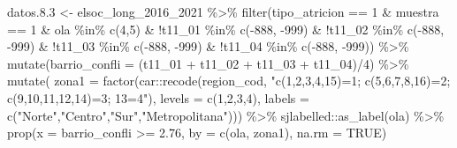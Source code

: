 \documentclass[
  12pt,
]{book}
\newenvironment{Shaded}{\begin{snugshade}}{\end{snugshade}}
\newcommand{\AttributeTok}[1]{\textcolor[rgb]{0.77,0.63,0.00}{#1}}
\newcommand{\ConstantTok}[1]{\textcolor[rgb]{0.00,0.00,0.00}{#1}}
\newcommand{\DecValTok}[1]{\textcolor[rgb]{0.00,0.00,0.81}{#1}}
\newcommand{\FloatTok}[1]{\textcolor[rgb]{0.00,0.00,0.81}{#1}}
\newcommand{\FunctionTok}[1]{\textcolor[rgb]{0.00,0.00,0.00}{#1}}
\newcommand{\NormalTok}[1]{#1}
\newcommand{\OtherTok}[1]{\textcolor[rgb]{0.56,0.35,0.01}{#1}}
\newcommand{\SpecialCharTok}[1]{\textcolor[rgb]{0.00,0.00,0.00}{#1}}
\newcommand{\StringTok}[1]{\textcolor[rgb]{0.31,0.60,0.02}{#1}}
\begin{document}
\begin{Shaded}
\begin{Highlighting}[]
\NormalTok{datos.}\FloatTok{8.3} \OtherTok{\textless{}{-}}\NormalTok{ elsoc\_long\_2016\_2021 }\SpecialCharTok{\%\textgreater{}\%} 
  \FunctionTok{filter}\NormalTok{(tipo\_atricion }\SpecialCharTok{==} \DecValTok{1} \SpecialCharTok{\&}\NormalTok{ muestra }\SpecialCharTok{==} \DecValTok{1} \SpecialCharTok{\&}\NormalTok{ ola }\SpecialCharTok{\%in\%} \FunctionTok{c}\NormalTok{(}\DecValTok{4}\NormalTok{,}\DecValTok{5}\NormalTok{) }\SpecialCharTok{\&} \SpecialCharTok{!}\NormalTok{t11\_01 }\SpecialCharTok{\%in\%} \FunctionTok{c}\NormalTok{(}\SpecialCharTok{{-}}\DecValTok{888}\NormalTok{, }\SpecialCharTok{{-}}\DecValTok{999}\NormalTok{) }\SpecialCharTok{\&}
           \SpecialCharTok{!}\NormalTok{t11\_02 }\SpecialCharTok{\%in\%} \FunctionTok{c}\NormalTok{(}\SpecialCharTok{{-}}\DecValTok{888}\NormalTok{, }\SpecialCharTok{{-}}\DecValTok{999}\NormalTok{) }\SpecialCharTok{\&} \SpecialCharTok{!}\NormalTok{t11\_03 }\SpecialCharTok{\%in\%} \FunctionTok{c}\NormalTok{(}\SpecialCharTok{{-}}\DecValTok{888}\NormalTok{, }\SpecialCharTok{{-}}\DecValTok{999}\NormalTok{) }\SpecialCharTok{\&} \SpecialCharTok{!}\NormalTok{t11\_04 }\SpecialCharTok{\%in\%} \FunctionTok{c}\NormalTok{(}\SpecialCharTok{{-}}\DecValTok{888}\NormalTok{, }\SpecialCharTok{{-}}\DecValTok{999}\NormalTok{)) }\SpecialCharTok{\%\textgreater{}\%} 
  \FunctionTok{mutate}\NormalTok{(}\AttributeTok{barrio\_confli =}\NormalTok{ (t11\_01 }\SpecialCharTok{+}\NormalTok{ t11\_02 }\SpecialCharTok{+}\NormalTok{ t11\_03 }\SpecialCharTok{+}\NormalTok{ t11\_04)}\SpecialCharTok{/}\DecValTok{4}\NormalTok{) }\SpecialCharTok{\%\textgreater{}\%}
  \FunctionTok{mutate}\NormalTok{( }\AttributeTok{zona1 =} \FunctionTok{factor}\NormalTok{(car}\SpecialCharTok{::}\FunctionTok{recode}\NormalTok{(region\_cod, }
                                     \StringTok{"c(1,2,3,4,15)=1; c(5,6,7,8,16)=2; c(9,10,11,12,14)=3; 13=4"}\NormalTok{),}
                        \AttributeTok{levels =} \FunctionTok{c}\NormalTok{(}\DecValTok{1}\NormalTok{,}\DecValTok{2}\NormalTok{,}\DecValTok{3}\NormalTok{,}\DecValTok{4}\NormalTok{), }
                        \AttributeTok{labels =} \FunctionTok{c}\NormalTok{(}\StringTok{"Norte"}\NormalTok{,}\StringTok{"Centro"}\NormalTok{,}\StringTok{"Sur"}\NormalTok{,}\StringTok{"Metropolitana"}\NormalTok{))) }\SpecialCharTok{\%\textgreater{}\%}
\NormalTok{  sjlabelled}\SpecialCharTok{::}\FunctionTok{as\_label}\NormalTok{(ola) }\SpecialCharTok{\%\textgreater{}\%}
  \FunctionTok{prop}\NormalTok{(}\AttributeTok{x =}\NormalTok{ barrio\_confli }\SpecialCharTok{\textgreater{}=} \FloatTok{2.76}\NormalTok{, }\AttributeTok{by =} \FunctionTok{c}\NormalTok{(ola, zona1), }\AttributeTok{na.rm =} \ConstantTok{TRUE}\NormalTok{)}


\end{Highlighting}
\end{Shaded}
\end{document}
